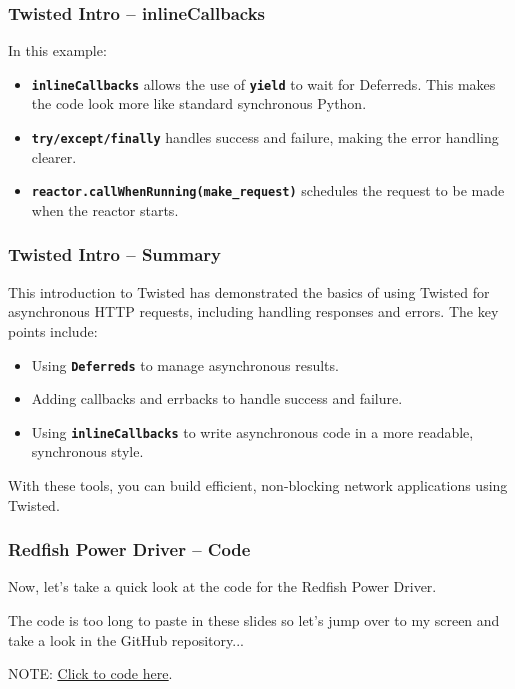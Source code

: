 \documentclass{beamer}
\begin{document}
    \begin{frame}
        \frametitle{Twisted Intro -- inlineCallbacks}

        \noindent In this example:
        \begin{itemize}
            \item \textbf{\texttt{inlineCallbacks}} allows the use of \textbf{\texttt{yield}} to wait for Deferreds. This makes the code look more like standard synchronous Python.
            \item \textbf{\texttt{try/except/finally}} handles success and failure, making the error handling clearer.
            \item \textbf{\texttt{reactor.callWhenRunning(make\_request)}} schedules the request to be made when the reactor starts.
        \end{itemize}
    \end{frame}

    \begin{frame}
        \frametitle{Twisted Intro -- Summary}
        This introduction to Twisted has demonstrated the basics of using Twisted for asynchronous HTTP requests, including handling responses and errors. The key points include:
        \begin{itemize}
            \item Using \textbf{\texttt{Deferreds}} to manage asynchronous results.
            \item Adding callbacks and errbacks to handle success and failure.
            \item Using \textbf{\texttt{inlineCallbacks}} to write asynchronous code in a more readable, synchronous style.
        \end{itemize}

        With these tools, you can build efficient, non-blocking network applications using Twisted.
    \end{frame}

    \begin{frame}
        \frametitle{Redfish Power Driver -- Code}

        Now, let's take a quick look at the code for the Redfish Power Driver.

        The code is too long to paste in these slides so let's jump over to my screen and take a look in the GitHub repository...

        NOTE: \href{https://github.com/canonical/maas/blob/master/src/provisioningserver/drivers/power/redfish.py}{\underline{Click to code here}}.
    \end{frame}
\end{document}
